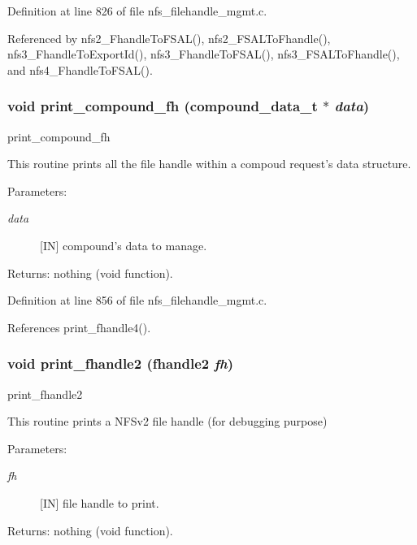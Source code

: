 Definition at line 826 of file nfs\_\-filehandle\_\-mgmt.c.

Referenced by nfs2\_\-Fhandle\-To\-FSAL(), nfs2\_\-FSALTo\-Fhandle(), nfs3\_\-Fhandle\-To\-Export\-Id(), nfs3\_\-Fhandle\-To\-FSAL(), nfs3\_\-FSALTo\-Fhandle(), and nfs4\_\-Fhandle\-To\-FSAL().
\subsubsection{\setlength{\rightskip}{0pt plus 5cm}void print\_\-compound\_\-fh (compound\_\-data\_\-t $\ast$ {\em data})}\label{nfs__filehandle__mgmt_8c_a26}


print\_\-compound\_\-fh

This routine prints all the file handle within a compoud request's data structure.

\begin{Desc}
\item[Parameters:]
\begin{description}
\item[{\em data}][IN] compound's data to manage.\end{description}
\end{Desc}
\begin{Desc}
\item[Returns:]nothing (void function). \end{Desc}


Definition at line 856 of file nfs\_\-filehandle\_\-mgmt.c.

References print\_\-fhandle4().
\subsubsection{\setlength{\rightskip}{0pt plus 5cm}void print\_\-fhandle2 (fhandle2 {\em fh})}\label{nfs__filehandle__mgmt_8c_a18}


print\_\-fhandle2

This routine prints a NFSv2 file handle (for debugging purpose)

\begin{Desc}
\item[Parameters:]
\begin{description}
\item[{\em fh}][IN] file handle to print.\end{description}
\end{Desc}
\begin{Desc}
\item[Returns:]nothing (void function). \end{Desc}


